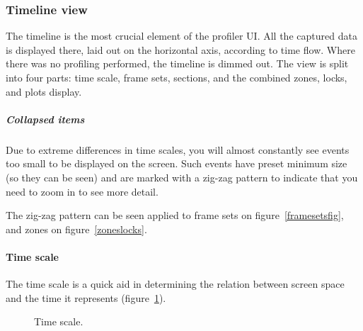 \documentclass[hidelinks,titlepage,a4paper,twoside]{article}
\begin{document}
\subsubsection{Timeline view}

The timeline is the most crucial element of the profiler UI. All the captured data is displayed there, laid out on the horizontal axis, according to time flow. Where there was no profiling performed, the timeline is dimmed out. The view is split into four parts: time scale, frame sets, sections, and the combined zones, locks, and plots display.

\subparagraph{Collapsed items}
\label{collapseditems}

Due to extreme differences in time scales, you will almost constantly see events too small to be displayed on the screen. Such events have preset minimum size (so they can be seen) and are marked with a zig-zag pattern to indicate that you need to zoom in to see more detail.

The zig-zag pattern can be seen applied to frame sets on figure~\ref{framesetsfig}, and zones on figure~\ref{zoneslocks}.

\paragraph{Time scale}

The time scale is a quick aid in determining the relation between screen space and the time it represents (figure~\ref{timescale}).

\begin{figure}[h]
\centering{}
\caption{Time scale.}
\label{timescale}
\end{figure}
\end{document}
